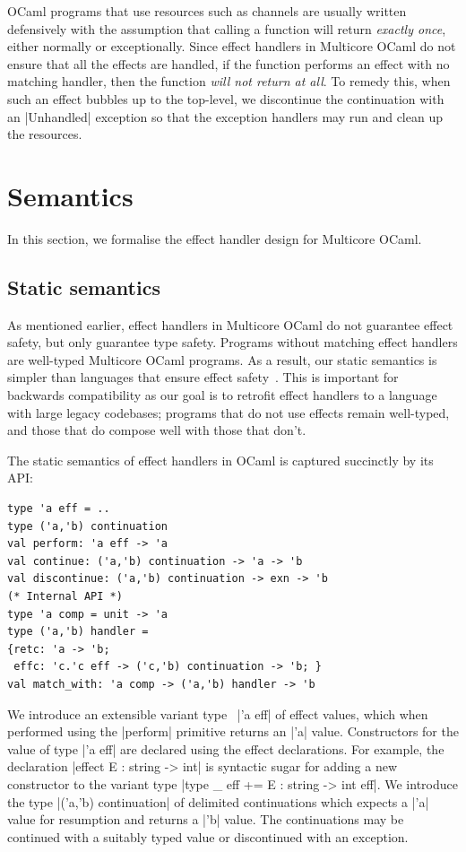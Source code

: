 \documentclass[sigplan,screen]{acmart}
\begin{document}
OCaml programs that use resources such as channels are usually written defensively
with the assumption that calling a function will return \emph{exactly once},
either normally or exceptionally. Since effect handlers in Multicore OCaml do
not ensure that all the effects are handled, if the function performs an effect
with no matching handler, then the function \emph{will not return at all}. To
remedy this, when such an effect bubbles up to the top-level, we discontinue the
continuation with an |Unhandled| exception so that the exception handlers may
run and clean up the resources.

\section{Semantics}
\label{sec:semantics}

In this section, we formalise the effect handler design for Multicore OCaml.

\subsection{Static semantics}
\label{sec:static_semantics}

As mentioned earlier, effect handlers in Multicore OCaml do not guarantee
effect safety, but only guarantee type safety. Programs without matching effect
handlers are well-typed Multicore OCaml programs. As a result, our static
semantics is simpler than languages that ensure effect safety~\cite{Eff,
Hillerstrom20, Leijen14, Effekt, Frank, Biernacki19}. This is important for
backwards compatibility as our goal is to retrofit effect handlers to a
language with large legacy codebases; programs that do not use effects remain
well-typed, and those that do compose well with those that don't.

The static semantics of effect handlers in OCaml is captured succinctly by its
API:
\begin{lstlisting}
type 'a eff = ..
type ('a,'b) continuation
val perform: 'a eff -> 'a
val continue: ('a,'b) continuation -> 'a -> 'b
val discontinue: ('a,'b) continuation -> exn -> 'b
(* Internal API *)
type 'a comp = unit -> 'a
type ('a,'b) handler =
{retc: 'a -> 'b;
 effc: 'c.'c eff -> ('c,'b) continuation -> 'b; }
val match_with: 'a comp -> ('a,'b) handler -> 'b
\end{lstlisting}
We introduce an extensible variant type~\cite{ExtVariants} |'a eff| of effect
values, which when performed using the |perform| primitive returns an |'a|
value. Constructors for the value of type |'a eff| are declared using the
effect declarations. For example, the declaration |effect E : string -> int|
is syntactic sugar for adding a new constructor to the variant type
|type _ eff += E : string -> int eff|. We introduce the type
|('a,'b) continuation| of delimited continuations which expects a |'a| value for
resumption and returns a |'b| value. The continuations may be continued with a
suitably typed value or discontinued with an exception.
\end{document}
